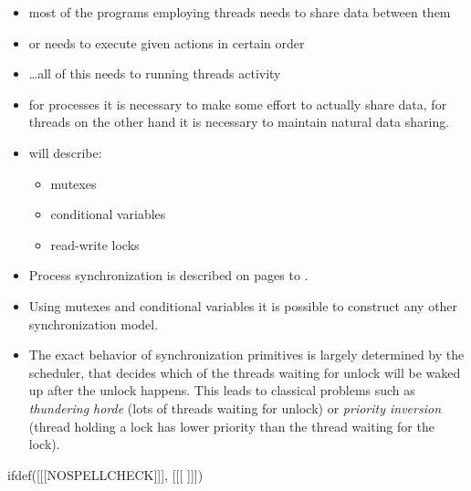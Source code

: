 
\begin{slide}

\begin{itemize}
\item most of the programs employing threads needs to share data between them
\item or needs to execute given actions in certain order
\item \dots{}all of this needs to  running threads activity
\item for processes it is necessary to make some effort to actually share data,
for threads on the other hand it is necessary to maintain natural data sharing.
\item will describe:
\begin{itemize}
\item mutexes
\item conditional variables
\item read-write locks
\end{itemize}
\end{itemize}
\end{slide}

\label{THREADSYNCHRONIZATION}

\begin{itemize}
\item Process synchronization is described on pages
\pageref{SYNCHRONIZATION} to \pageref{SYNCHRONIZATIONEND}.
\item Using mutexes and conditional variables it is possible to construct any
other synchronization model.
\item The exact behavior of synchronization primitives is largely determined by
the scheduler, that decides which of the threads waiting for unlock will be
waked up after the unlock happens. This leads to classical problems such as
\emph{thundering horde} (lots of threads waiting for unlock)
or \emph{priority inversion} (thread holding a lock has lower priority than
the thread waiting for the lock).
\end{itemize}


ifdef([[[NOSPELLCHECK]]], [[[
]]])

